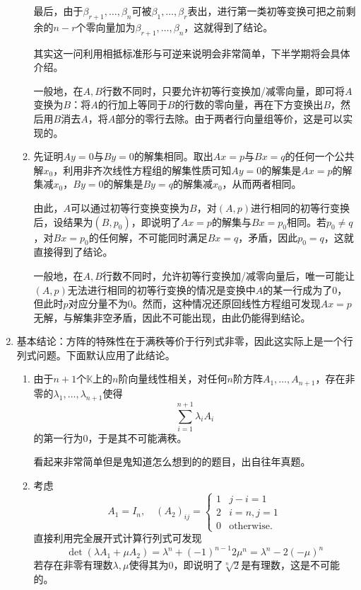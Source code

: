 \documentclass[a4paper,UTF8,fontset=windows]{ctexart}
\newcommand*{\note}{\noindent *}
\begin{document}
\begin{enumerate}
\begin{enumerate}[(1)]
        最后，由于$\beta_{r+1},\dots,\beta_n$可被$\beta_1,\dots,\beta_r$表出，进行第一类初等变换可把之前剩余的$n-r$个零向量加为$\beta_{r+1},\dots,\beta_n$，这就得到了结论。

        \note 其实这一问利用相抵标准形与可逆来说明会非常简单，下半学期将会具体介绍。

        \note 一般地，在$A,B$行数不同时，只要允许初等行变换加/减零向量，即可将$A$变换为$B$：将$A$的行加上等同于$B$的行数的零向量，再在下方变换出$B$，然后用$B$消去$A$，将$A$部分的零行去除。由于两者行向量组等价，这是可以实现的。

        \item 先证明$Ay=0$与$By=0$的解集相同。取出$Ax=p$与$Bx=q$的任何一个公共解$x_0$，利用非齐次线性方程组的解集性质可知$Ay=0$的解集是$Ax=p$的解集减$x_0$，$By=0$的解集是$By=q$的解集减$x_0$，从而两者相同。
        
        由此，$A$可以通过初等行变换变换为$B$，对$(A,p)$进行相同的初等行变换后，设结果为$(B,p_0)$，即说明了$Ax=p$的解集与$Bx=p_0$相同。若$p_0\ne q$，对$Bx=p_0$的任何解，不可能同时满足$Bx=q$，矛盾，因此$p_0=q$，这就直接得到了结论。

        \note 一般地，在$A,B$行数不同时，允许初等行变换加/减零向量后，唯一可能让$(A,p)$无法进行相同的初等行变换的情况是变换中$A$的某一行成为了0，但此时$p$对应分量不为0。然而，这种情况还原回线性方程组可发现$Ax=p$无解，与解集非空矛盾，因此不可能出现，由此仍能得到结论。
    \end{enumerate}

    \item
    \note 基本结论：方阵的特殊性在于满秩等价于行列式非零，因此这实际上是一个行列式问题。下面默认应用了此结论。
    \begin{enumerate}[(1)]
        \item 由于$n+1$个$\mathbb{K}$上的$n$阶向量线性相关，对任何$n$阶方阵$A_1,\dots,A_{n+1}$，存在非零的$\lambda_1,\dots,\lambda_{n+1}$使得
        $$\sum_{i=1}^{n+1}\lambda_iA_i$$
        的第一行为0，于是其不可能满秩。

        \note 看起来非常简单但是鬼知道怎么想到的的题目，出自往年真题。

        \item 
        考虑
        $$A_1=I_n,\quad(A_2)_{ij}=\begin{cases}1&j-i=1\\2&i=n,j=1\\0&\mathrm{otherwise.}\end{cases}$$
        直接利用完全展开式计算行列式可发现
        $$\det(\lambda A_1+\mu A_2)=\lambda^n+(-1)^{n-1}2\mu^n=\lambda^n-2(-\mu)^n$$
        若存在非零有理数$\lambda,\mu$使得其为0，即说明了$\sqrt[n]{2}$是有理数，这是不可能的。


\end{enumerate}
\end{enumerate}
\end{document}
